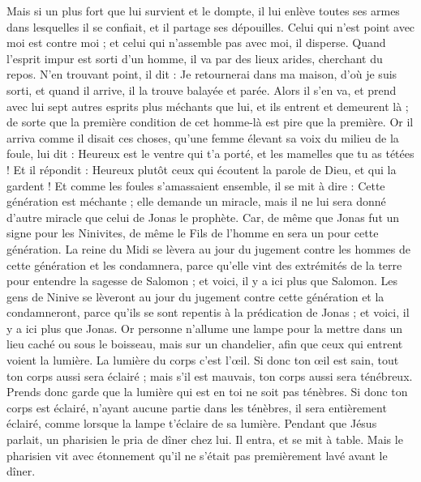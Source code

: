\begin{multicols}{2}
Mais si un plus fort que lui survient et le dompte, il lui enlève toutes ses armes dans lesquelles il se confiait, et il partage ses dépouilles.
Celui qui n'est point avec moi est contre moi ; et celui qui n'assemble pas avec moi, il disperse.
Quand l'esprit impur est sorti d'un homme, il va par des lieux arides, cherchant du repos. N'en trouvant point, il dit : Je retournerai dans ma maison, d'où je suis sorti,
et quand il arrive, il la trouve balayée et parée.
Alors il s'en va, et prend avec lui sept autres esprits plus méchants que lui, et ils entrent et demeurent là ; de sorte que la première condition de cet homme-là est pire que la première.
Or il arriva comme il disait ces choses, qu'une femme élevant sa voix du milieu de la foule, lui dit : Heureux est le ventre qui t'a porté, et les mamelles que tu as tétées !
Et il répondit : Heureux plutôt ceux qui écoutent la parole de Dieu, et qui la gardent !
Et comme les foules s'amassaient ensemble, il se mit à dire : Cette génération est méchante ; elle demande un miracle, mais il ne lui sera donné d'autre miracle que celui de Jonas le prophète.
Car, de même que Jonas fut un signe pour les Ninivites, de même le Fils de l'homme en sera un pour cette génération.
La reine du Midi se lèvera au jour du jugement contre les hommes de cette génération et les condamnera, parce qu'elle vint des extrémités de la terre pour entendre la sagesse de Salomon ; et voici, il y a ici plus que Salomon.
Les gens de Ninive se lèveront au jour du jugement contre cette génération et la condamneront, parce qu'ils se sont repentis à la prédication de Jonas ; et voici, il y a ici plus que Jonas.
Or personne n'allume une lampe pour la mettre dans un lieu caché ou sous le boisseau, mais sur un chandelier, afin que ceux qui entrent voient la lumière.
La lumière du corps c'est l'œil. Si donc ton œil est sain, tout ton corps aussi sera éclairé ; mais s'il est mauvais, ton corps aussi sera ténébreux.
Prends donc garde que la lumière qui est en toi ne soit pas ténèbres.
Si donc ton corps est éclairé, n'ayant aucune partie dans les ténèbres, il sera entièrement éclairé, comme lorsque la lampe t'éclaire de sa lumière.
Pendant que Jésus parlait, un pharisien le pria de dîner chez lui. Il entra, et se mit à table.
Mais le pharisien vit avec étonnement qu'il ne s'était pas premièrement lavé avant le dîner.

\end{multicols}
